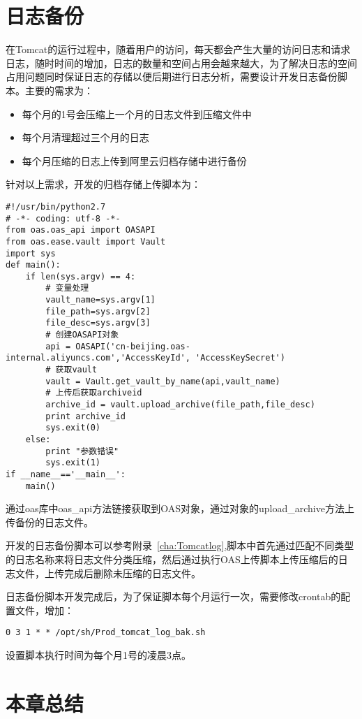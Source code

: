 \section{日志备份}
在Tomcat的运行过程中，随着用户的访问，每天都会产生大量的访问日志和请求日志，随时时间的增加，日志的数量和空间占用会越来越大，为了解决日志的空间占用问题同时保证日志的存储以便后期进行日志分析，需要设计开发日志备份脚本。主要的需求为：
\begin{itemize}
\item 每个月的1号会压缩上一个月的日志文件到压缩文件中
\item 每个月清理超过三个月的日志
\item 每个月压缩的日志上传到阿里云归档存储中进行备份
\end{itemize}
针对以上需求，开发的归档存储上传脚本为：
\begin{lstlisting}[numbers=none]
#!/usr/bin/python2.7
# -*- coding: utf-8 -*-
from oas.oas_api import OASAPI
from oas.ease.vault import Vault
import sys
def main():
    if len(sys.argv) == 4:
        # 变量处理
        vault_name=sys.argv[1]
        file_path=sys.argv[2]
        file_desc=sys.argv[3]
        # 创建OASAPI对象
        api = OASAPI('cn-beijing.oas-internal.aliyuncs.com','AccessKeyId', 'AccessKeySecret')
        # 获取vault
        vault = Vault.get_vault_by_name(api,vault_name)
        # 上传后获取archiveid
        archive_id = vault.upload_archive(file_path,file_desc)
        print archive_id
        sys.exit(0)
    else:
        print "参数错误"
        sys.exit(1)
if __name__=='__main__':
    main()
\end{lstlisting}
通过oas库中oas\_api方法链接获取到OAS对象，通过对象的upload\_archive方法上传备份的日志文件。

开发的日志备份脚本可以参考附录~\ref{cha:Tomcatlog},脚本中首先通过匹配不同类型的日志名称来将日志文件分类压缩，然后通过执行OAS上传脚本上传压缩后的日志文件，上传完成后删除未压缩的日志文件。

日志备份脚本开发完成后，为了保证脚本每个月运行一次，需要修改crontab的配置文件，增加：
\begin{lstlisting}[numbers=none]
0 3 1 * * /opt/sh/Prod_tomcat_log_bak.sh
\end{lstlisting}
设置脚本执行时间为每个月1号的凌晨3点。
\label{cha:Monitor-aliyun}
\section{本章总结}
